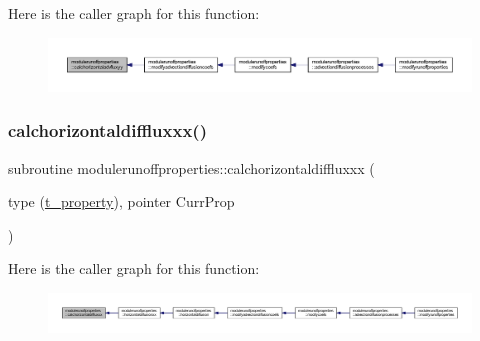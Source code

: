 Here is the caller graph for this function\+:\nopagebreak
\begin{figure}[H]
\begin{center}
\leavevmode
\includegraphics[width=350pt]{namespacemodulerunoffproperties_a9d3bb361bae08dcb2b84d831a49712be_icgraph}
\end{center}
\end{figure}
\mbox{\label{namespacemodulerunoffproperties_a296ba41d998d7fe4223d8d224ba9c0ba}} 
\subsubsection{\texorpdfstring{calchorizontaldiffluxxx()}{calchorizontaldiffluxxx()}}
{\footnotesize\ttfamily subroutine modulerunoffproperties\+::calchorizontaldiffluxxx (\begin{DoxyParamCaption}\item[{type (\mbox{\hyperlink{structmodulerunoffproperties_1_1t__property}{t\+\_\+property}}), pointer}]{Curr\+Prop }\end{DoxyParamCaption})\hspace{0.3cm}{\ttfamily [private]}}

Here is the caller graph for this function\+:\nopagebreak
\begin{figure}[H]
\begin{center}
\leavevmode
\includegraphics[width=350pt]{namespacemodulerunoffproperties_a296ba41d998d7fe4223d8d224ba9c0ba_icgraph}
\end{center}
\end{figure}
\mbox{\label{namespacemodulerunoffproperties_af55b2182548c087b1f254c0a7fe61904}} 
